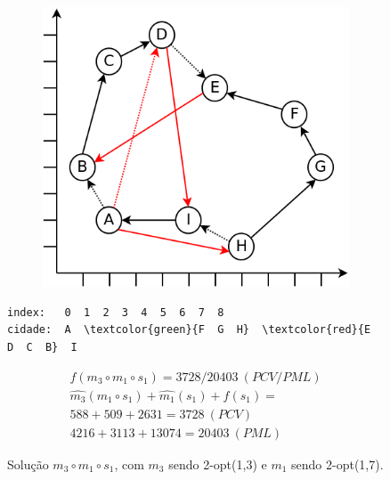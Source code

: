 \begin{figure}[ht]
    \begin{minipage}{.475\textwidth}
        \begin{subfigure}[t]{1\textwidth} %
            \includegraphics[width=1\linewidth]{figuras/pml/exemplo-rodolfo-2opt-1-3-1-7.png}
        \end{subfigure}
    \end{minipage}
    \begin{minipage}{.475\textwidth}
\begin{Verbatim}[commandchars=\\\{\}]
index:   0  1  2  3  4  5  6  7  8
cidade:  A  \textcolor{green}{F  G  H}  \textcolor{red}{E  D  C  B}  I
\end{Verbatim}
\begin{gather*}
f(m_3 \circ m_1 \circ s_1) = 3728/20403 \ (PCV/PML) \\
\widehat{m_3}(m_1 \circ s_1)+\widehat{m_1}(s_1)+f(s_1) = \\
588+509+2631=3728 \ (PCV) \\
4216+3113+13074=20403 \ (PML)
\end{gather*}
    \end{minipage}
    \caption{Solução $m_3 \circ m_1 \circ s_1$, com $m_3$ sendo 2-opt(1,3) e $m_1$ sendo 2-opt(1,7).}
    \label{fig:figuraExemplo_m3m1s1}
\end{figure}

